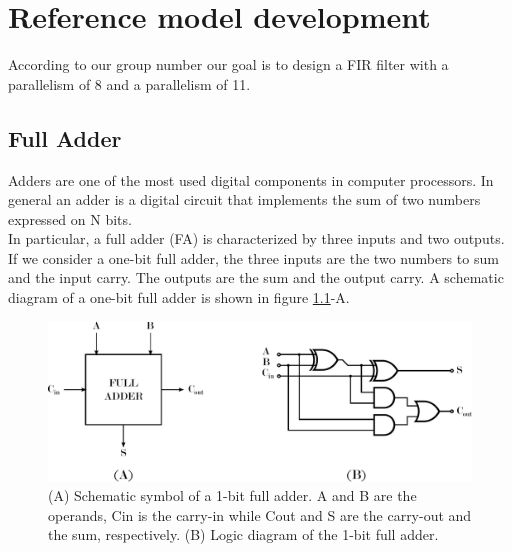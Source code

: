 %
\chapter{Reference model development}
\label{chap1}



According to our group number our goal is to design a FIR filter with a parallelism of 8 and a parallelism of 11.

\section{Full Adder}

Adders are one of the most used digital components in computer processors. In general an adder is a digital circuit that implements the sum of two numbers expressed on N bits.\\
In particular, a full adder (FA) is characterized by three inputs and two outputs. If we consider a one-bit full adder, the three inputs are the two numbers to sum and the input carry. The outputs are the sum and the output carry. A schematic diagram of a one-bit full adder is shown in figure \ref{fig:fa}-A. %


	\begin{figure}[ht]
	\centering
	\includegraphics[width=\textwidth]{chapters/figures/fa} 
	\caption{(A) Schematic symbol of a 1-bit full adder. A and B are the operands, Cin is the carry-in while Cout and S are the carry-out and the sum, respectively. (B) Logic diagram of the 1-bit full adder.}
	\label{fig:fa}  %
	\end{figure}

